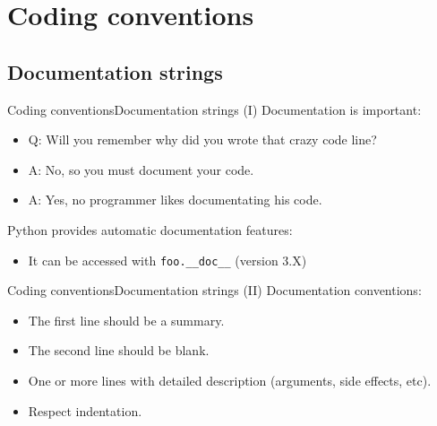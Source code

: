 \documentclass[10pt,compress]{beamer} %
\begin{document}
\section{Coding conventions}
\subsection{Documentation strings}
\begin{frame}{Coding conventions}{Documentation strings (I)}
\vspace{-0.3cm}
	Documentation is important:
		\begin{itemize}
		\item \small {Q: Will you remember why did you wrote that crazy code line?}
		\item \small {A: No, so you must document your code.}
		\item \small {A: Yes, no programmer likes documentating his code.}
		\end{itemize}
	Python provides automatic documentation features:
		\begin{itemize}
		\item \small It can be accessed with \texttt{foo.\_\_doc\_\_} (version 3.X)
		\end{itemize}
	\vspace{-0.2cm}
		\scriptsize{
		\begin{block}{}
		\vspace{-0.4cm}
		
		\vspace{-0.2cm}
		\end{block}
		}
\end{frame}

\begin{frame}{Coding conventions}{Documentation strings (II)}
	Documentation conventions:
		\begin{itemize}
		\item The first line should be a summary.
		\item The second line should be blank.
		\item One or more lines with detailed description (arguments, side effects, etc).
		\item Respect indentation.
		\end{itemize}

		\vspace{-0.4cm}
    	\begin{columns}
    	\column{0.7\textwidth}
		\begin{block}{}
		\vspace{-0.2cm}
		
		\vspace{-0.2cm}
		\end{block}
		\end{columns}
\end{frame}
\end{document}

